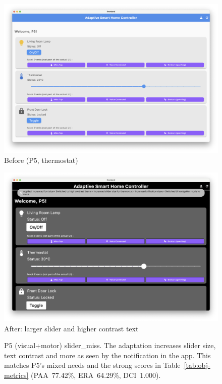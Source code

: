 \documentclass[openany]{book}
\begin{document}
\begin{figure}[H]
\centering
\begin{minipage}{0.48\textwidth}
  \includegraphics[width=\linewidth]{images/microcase_p5_before.png}\\[-0.5em]
  \centering\small Before (P5, thermostat)
\end{minipage}\hfill
\begin{minipage}{0.48\textwidth}
  \includegraphics[width=\linewidth]{images/microcase_p5_after.png}\\[-0.5em]
  \centering\small After: larger slider and higher contrast text
\end{minipage}
\caption{P5 (visual+motor) slider\_miss. The adaptation increases slider size, text contrast and more as seen by the notification in the app. This matches P5’s mixed needs and the strong scores in Table~\ref{tab:obj-metrics} (PAA~77.42\%, ERA~64.29\%, DCI~1.000).}
\label{fig:micro-p5}
\end{figure}
\end{document}
